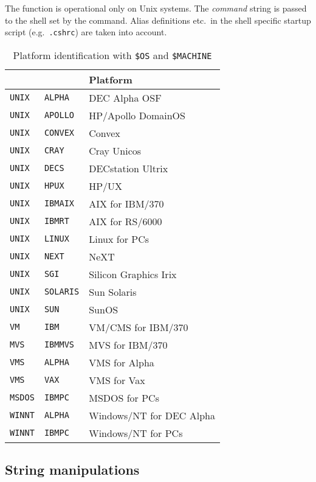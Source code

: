 \begin{UL}
The  function is operational only on Unix systems.
The \textsl{command} string is passed to the shell set by the
 command.
Alias definitions etc.\ in the shell specific startup script (e.g.\
\texttt{.cshrc}) are taken into account.
\end{UL}

\begin{table}
\centering\begin{tabular}{|l||l|l|}
\hline
\SysFind{OS} & \SysFind{MACHINE} & Platform \\
\hline
{\tt UNIX} & {\tt ALPHA} & DEC Alpha OSF \\
{\tt UNIX} & {\tt APOLLO} & HP/Apollo DomainOS \\
{\tt UNIX} & {\tt CONVEX} & Convex \\
{\tt UNIX} & {\tt CRAY} & Cray Unicos \\
{\tt UNIX} & {\tt DECS} & DECstation Ultrix \\
{\tt UNIX} & {\tt HPUX} & HP/UX \\
{\tt UNIX} & {\tt IBMAIX} & AIX for IBM/370 \\
{\tt UNIX} & {\tt IBMRT} & AIX for RS/6000 \\
{\tt UNIX} & {\tt LINUX} & Linux for PCs \\
{\tt UNIX} & {\tt NEXT} & NeXT \\
{\tt UNIX} & {\tt SGI} & Silicon Graphics Irix \\
{\tt UNIX} & {\tt SOLARIS} & Sun Solaris \\
{\tt UNIX} & {\tt SUN} & SunOS \\
{\tt VM} & {\tt IBM} & VM/CMS for IBM/370 \\
{\tt MVS} & {\tt IBMMVS} & MVS for IBM/370 \\
{\tt VMS} & {\tt ALPHA} & VMS for Alpha \\
{\tt VMS} & {\tt VAX} & VMS for Vax \\
{\tt MSDOS} & {\tt IBMPC} & MSDOS for PCs \\
{\tt WINNT} & {\tt ALPHA} & Windows/NT for DEC Alpha \\
{\tt WINNT} & {\tt IBMPC} & Windows/NT for PCs \\
\hline
\end{tabular}
\caption{Platform identification with {\tt \$OS} and {\tt \$MACHINE}}
\label{tab-os-machine}
\end{table}


\subsection{String manipulations}

